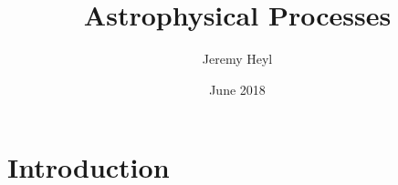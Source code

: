 \documentclass{article}
\title{Astrophysical Processes}
\author{Jeremy Heyl}
\date{June 2018}
\begin{document}
\maketitle

\section{Introduction}
\end{document}

